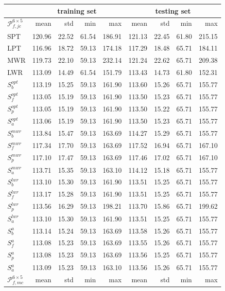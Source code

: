 {\renewcommand{\arraystretch}{0.8}
\begin{table}{\tiny 
\begin{tabular}{|l|rrrr|rrrr|} \hline 
& \multicolumn{4}{c|}{training set}& \multicolumn{4}{c|}{testing set} \\
\hline
$\mathcal{P}^{6\times5}_{f,jc}$ & mean & std & min & max & mean & std & min & max \\
\hline
SPT &120.96&22.52&61.54&186.91&121.13&22.45&61.80&215.15\\
LPT &116.96&18.72&59.13&174.18&117.29&18.48&65.71&184.11\\
MWR &119.73&22.10&59.13&232.14&121.24&22.62&65.71&209.38\\
LWR &113.09&14.49&61.54&151.79&113.43&14.73&61.80&152.31\\
$S^{opt}_b$ &113.19&15.25&59.13&161.90&113.60&15.26&65.71&155.77\\
$S^{opt}_f$ &113.05&15.19&59.13&161.90&113.50&15.23&65.71&155.77\\
$S^{opt}_p$ &113.05&15.19&59.13&161.90&113.50&15.22&65.71&155.77\\
$S^{opt}_a$ &113.06&15.19&59.13&161.90&113.50&15.23&65.71&155.77\\
$S^{mwr}_b$ &113.84&15.47&59.13&163.69&114.27&15.29&65.71&155.77\\
$S^{mwr}_f$ &117.34&17.70&59.13&163.69&117.52&16.94&65.71&167.10\\
$S^{mwr}_p$ &117.10&17.47&59.13&163.69&117.46&17.02&65.71&167.10\\
$S^{mwr}_a$ &113.71&15.35&59.13&163.10&114.12&15.18&65.71&155.77\\
$S^{lwr}_b$ &113.10&15.30&59.13&161.90&113.51&15.25&65.71&155.77\\
$S^{lwr}_f$ &113.17&15.28&59.13&161.90&113.51&15.25&65.71&155.77\\
$S^{lwr}_p$ &113.56&16.29&59.13&198.21&113.70&15.86&65.71&199.62\\
$S^{lwr}_a$ &113.10&15.30&59.13&161.90&113.51&15.25&65.71&155.77\\
$S^{a}_b$ &113.14&15.24&59.13&163.69&113.58&15.26&65.71&155.77\\
$S^{a}_f$ &113.08&15.23&59.13&163.69&113.55&15.26&65.71&155.77\\
$S^{a}_p$ &113.08&15.23&59.13&163.69&113.56&15.25&65.71&155.77\\
$S^{a}_a$ &113.09&15.23&59.13&163.10&113.56&15.26&65.71&155.77\\
\hline
$\mathcal{P}^{6\times5}_{f,mc}$ & mean & std & min & max & mean & std & min & max \\

\end{tabular}}
\end{table}}
